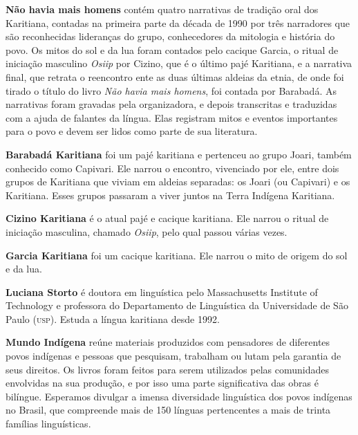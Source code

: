  \textbf{Não havia mais homens} contém quatro narrativas de tradição oral dos Karitiana, contadas na primeira parte da década de 1990 por três narradores que são reconhecidas lideranças do grupo, conhecedores da mitologia e história do povo. Os mitos do sol e da lua foram contados pelo cacique Garcia, o ritual de iniciação masculino \textit{Osiip} por Cizino, que é o último pajé Karitiana, e a narrativa final, que retrata o reencontro ente as duas últimas aldeias da etnia, de onde foi tirado o título do livro \textit{Não havia mais homens}, foi contada por Barabadá. As narrativas foram gravadas pela organizadora, e depois transcritas e traduzidas com a ajuda de falantes da língua. Elas registram mitos e eventos importantes para o povo e devem ser lidos como parte de sua literatura.

\textbf{Barabadá Karitiana} foi um pajé karitiana e pertenceu ao grupo Joari, também conhecido como Capivari. Ele narrou o encontro, vivenciado por ele, entre dois grupos de Karitiana que viviam em aldeias separadas: os Joari (ou Capivari) e os Karitiana. Esses grupos passaram a viver juntos na Terra Indígena Karitiana.

\textbf{Cizino Karitiana} é o atual pajé e cacique karitiana. Ele narrou o ritual de iniciação masculina, chamado \textit{Osiip}, pelo qual passou várias vezes.

\textbf{Garcia Karitiana} foi um cacique karitiana. Ele narrou o mito de origem do sol e da lua.

\textbf{Luciana Storto} é doutora em linguística pelo Massachusetts Institute of Technology e professora do Departamento de Linguística da Universidade de São Paulo (\textsc{usp}). Estuda a língua karitiana desde 1992.

\textbf{Mundo Indígena} reúne materiais produzidos com pensadores de diferentes povos indígenas e pessoas que pesquisam, trabalham ou lutam pela garantia de seus direitos. Os livros foram feitos para serem utilizados pelas comunidades envolvidas na sua produção, e por isso uma parte significativa das obras é bilíngue. Esperamos divulgar a imensa diversidade linguística dos povos indígenas no Brasil, que compreende mais de 150 línguas pertencentes a mais de trinta famílias linguísticas.

